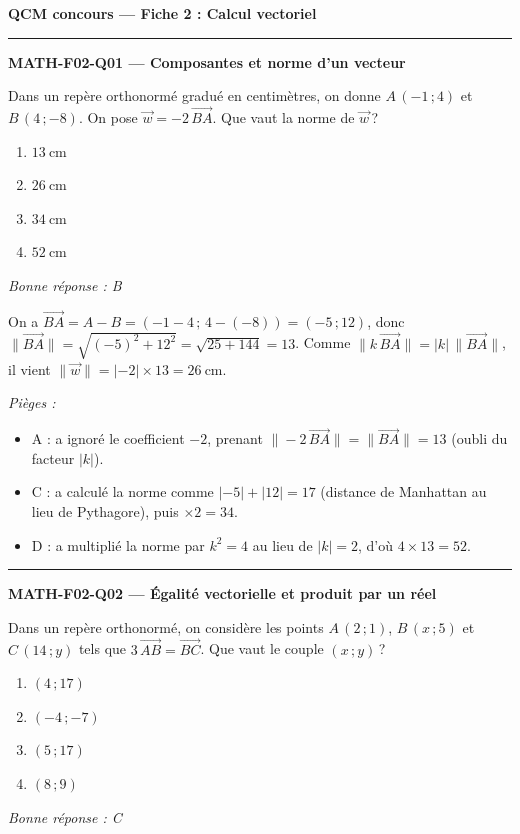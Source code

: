 \documentclass[11pt,a4paper]{article}
\newcommand{\vv}[1]{\vec{#1}}
\begin{document}
\begin{center}{\Large\bfseries QCM concours --- Fiche 2 : Calcul vectoriel}\end{center}
\vspace{6pt}\hrule\vspace{8pt}
\noindent\textbf{MATH-F02-Q01 --- Composantes et norme d'un vecteur}\par
Dans un repère orthonormé gradué en centimètres, on donne $A\,(-1\,;4)$ et $B\,(4\,;-8)$. On pose $\vv{w}=-2\,\vv{BA}$. Que vaut la norme de $\vv{w}$\,?
\begin{enumerate}[label=\Alph*)]
\item $\qty{13}{\centi\metre}$
\item $\qty{26}{\centi\metre}$
\item $\qty{34}{\centi\metre}$
\item $\qty{52}{\centi\metre}$
\end{enumerate}
\textit{Bonne réponse : B}\par
On a $\vv{BA}=A-B=(-1-4\,;\,4-(-8))=(-5\,;12)$, donc $\|\vv{BA}\|=\sqrt{(-5)^2+12^2}=\sqrt{25+144}=13$. Comme $\|k\,\vv{BA}\|=|k|\,\|\vv{BA}\|$, il vient $\|\vv{w}\|=|-2|\times 13=\qty{26}{\centi\metre}$.\par
\textit{Pièges :}
\begin{itemize}
\item A : a ignoré le coefficient $-2$, prenant $\|-2\,\vv{BA}\|=\|\vv{BA}\|=13$ (oubli du facteur $|k|$).
\item C : a calculé la norme comme $|-5|+|12|=17$ (distance de Manhattan au lieu de Pythagore), puis $\times 2=34$.
\item D : a multiplié la norme par $k^2=4$ au lieu de $|k|=2$, d'où $4\times 13=52$.
\end{itemize}
\vspace{8pt}\hrule\vspace{8pt}
\noindent\textbf{MATH-F02-Q02 --- Égalité vectorielle et produit par un réel}\par
Dans un repère orthonormé, on considère les points $A\,(2\,;1)$, $B\,(x\,;5)$ et $C\,(14\,;y)$ tels que $3\,\vv{AB}=\vv{BC}$. Que vaut le couple $(x\,;y)$\,?
\begin{enumerate}[label=\Alph*)]
\item $(4\,;17)$
\item $(-4\,;-7)$
\item $(5\,;17)$
\item $(8\,;9)$
\end{enumerate}
\textit{Bonne réponse : C}\par
\end{document}
